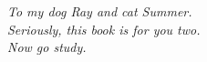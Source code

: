 \cleardoublepage
\thispagestyle{empty}
\vspace*{0.28\textheight}
\begin{flushright}
  \itshape\large
  To my dog Ray and cat Summer.\\[0.8em]
  Seriously, this book is for you two.\\[0.8em]
  Now go study.
\end{flushright}
\clearpage
